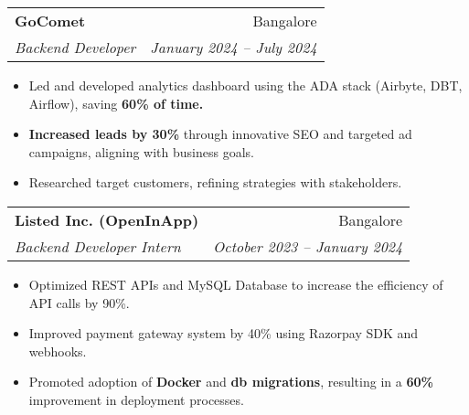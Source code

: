\documentclass[letterpaper,11pt]{article}
\makeatletter
\newcommand{\resumeItem}[1]{
  \item\small{
    {#1 \vspace{-2pt}}
  }
}
\newcommand{\resumeSubheading}[4]{
  \vspace{-2pt}\item
    \begin{tabular*}{0.97\textwidth}[t]{l@{\extracolsep{\fill}}r}
      \textbf{#1} & #2 \\
      \textit{\small#3} & \textit{\small #4} \\
    \end{tabular*}\vspace{-7pt}
}
\newcommand{\resumeItemListStart}{\begin{itemize}}
\newcommand{\resumeItemListEnd}{\end{itemize}\vspace{-5pt}}
\makeatother
\begin{document}

    \resumeSubheading
    {GoComet}{Bangalore}
    {Backend Developer}{January 2024 -- July 2024}
        \resumeItemListStart
            \resumeItem{Led and developed analytics dashboard using the ADA stack (Airbyte, DBT, Airflow), saving \textbf{60\% of time.}}
            \resumeItem{\textbf{Increased leads by 30\%} through innovative SEO and targeted ad campaigns, aligning with business goals.}
            \resumeItem{Researched target customers, refining strategies with stakeholders.}
        \resumeItemListEnd

    \resumeSubheading
    {Listed Inc. (OpenInApp)}{Bangalore}
    {Backend Developer Intern}{October 2023 -- January 2024}
        \resumeItemListStart
            \resumeItem{Optimized REST APIs and MySQL Database to increase the efficiency of API calls by 90\%.}
            \resumeItem{Improved payment gateway system by 40\% using Razorpay SDK and webhooks.}
            \resumeItem{Promoted adoption of \textbf{Docker} and \textbf{db migrations}, resulting in a \textbf{60\%} improvement in deployment processes.}
        \resumeItemListEnd

        
    
       
\end{document}
